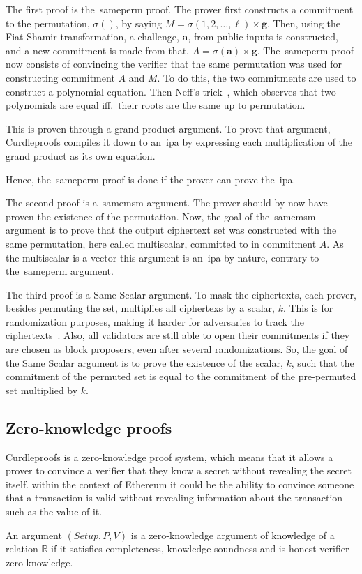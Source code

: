 The first proof is the~\gls{sameperm} proof.
The prover first constructs a commitment to the permutation, $\sigma()$, by saying $M=\sigma(1,2,\dots,\ell)\times\mathbf{g}$.
Then, using the Fiat-Shamir transformation, a challenge, $\mathbf{a}$, from public inputs is constructed, and a new commitment is made from that, $A=\sigma(\mathbf{a})\times\mathbf{g}$.
The~\gls{sameperm} proof now consists of convincing the verifier that the same permutation was used for constructing commitment $A$ and $M$.
To do this, the two commitments are used to construct a polynomial equation.
Then Neff's trick~\cite{10.1145/501983.502000}, which observes that two polynomials are equal iff.\ their roots are the same up to permutation.

This is proven through a grand product argument.
To prove that argument, Curdleproofs compiles it down to an~\gls{ipa} by expressing each multiplication of the grand product as its own equation.

Hence, the~\gls{sameperm} proof is done if the prover can prove the~\gls{ipa}.


The second proof is a~\gls{samemsm} argument.
The prover should by now have proven the existence of the permutation.
Now, the goal of the~\gls{samemsm} argument is to prove that the output ciphertext set was constructed with the same permutation, here called multiscalar, committed to in commitment $A$.
As the multiscalar is a vector this argument is an~\gls{ipa} by nature, contrary to the~\gls{sameperm} argument.

The third proof is a Same Scalar argument.
To mask the ciphertexts, each prover, besides permuting the set, multiplies all ciphertexs by a scalar, $k$.
This is for randomization purposes, making it harder for adversaries to track the ciphertexts~\cite{Whisk2024}.
Also, all validators are still able to open their commitments if they are chosen as block proposers, even after several randomizations.
So, the goal of the Same Scalar argument is to prove the existence of the scalar, $k$, such that the commitment of the permuted set is equal to the commitment of the pre-permuted set multiplied by $k$.



\subsection{Zero-knowledge proofs}\label{sec:background-zkps}
Curdleproofs is a zero-knowledge proof system, which means that it allows a prover to convince a verifier that they know a secret without revealing the secret itself.
within the context of Ethereum it could be the ability to convince someone that a transaction is valid without revealing information about the transaction such as the value of it.

\begin{definition}
    An argument $(Setup, P, V)$ is a zero-knowledge argument of knowledge of a relation $\mathbb{R}$ if it satisfies completeness, knowledge-soundness and is honest-verifier zero-knowledge.
\end{definition}

